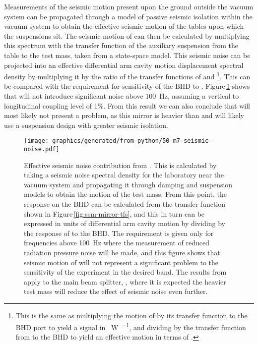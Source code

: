Measurements of the seismic motion present upon the ground outside the vacuum system can be propagated through a model of passive seismic isolation within the vacuum system to obtain the effective seismic motion of the tables upon which the suspensions sit. The seismic motion of \MSEVEN{} can then be calculated by multiplying this spectrum with the transfer function of the auxiliary suspension from the table to the test mass, taken from a state-space model. This seismic noise can be projected into an effective differential arm cavity motion displacement spectral density by multiplying it by the ratio of the transfer functions of \MSEVEN{} and \LMINUS{}\footnote{This is the same as multiplying the motion of \MSEVEN{} by its transfer function to the \gls{BHD} port to yield a signal in \SI{}{\watt\per\sqrthz}, and dividing by the transfer function from \LMINUS{} to the \gls{BHD} to yield an effective motion in terms of \LMINUS{}.}. This can be compared with the requirement for sensitivity of the \gls{BHD} to \LMINUS{}. Figure\,\ref{fig:m7-seismic-noise} shows that \MSEVEN{} will not introduce significant noise above \SI{100}{\hertz}, assuming a vertical to longitudinal coupling level of 1\%. From this result we can also conclude that \MSIX{} will most likely not present a problem, as this mirror is heavier than \MSEVEN{} and will likely use a suspension design with greater seismic isolation.

\begin{figure}
  \centering
  \texttt{[image: graphics/generated/from-python/50-m7-seismic-noise.pdf]}
  \caption[Effective \LMINUS{} seismic noise contribution from \MSEVEN{}]{\label{fig:m7-seismic-noise}Effective \LMINUS{} seismic noise contribution from \MSEVEN{}. This is calculated by taking a seismic noise spectral density for the laboratory near the vacuum system and propagating it through damping and suspension models to obtain the motion of the \MSEVEN{} test mass. From this point, the response on the \gls{BHD} can be calculated from the transfer function shown in Figure\,\ref{fig:ssm-mirror-tfs}, and this in turn can be expressed in units of differential arm cavity motion by dividing by the response of \LMINUS{} to the \gls{BHD}. The requirement is given only for frequencies above \SI{100}{\hertz} where the measurement of reduced radiation pressure noise will be made, and this figure shows that seismic motion of \MSEVEN{} will not represent a significant problem to the sensitivity of the experiment in the desired band. The results from \MSEVEN{} apply to the main beam splitter, \MSIX{}, where it is expected the heavier test mass will reduce the effect of seismic noise even further.}
\end{figure}

